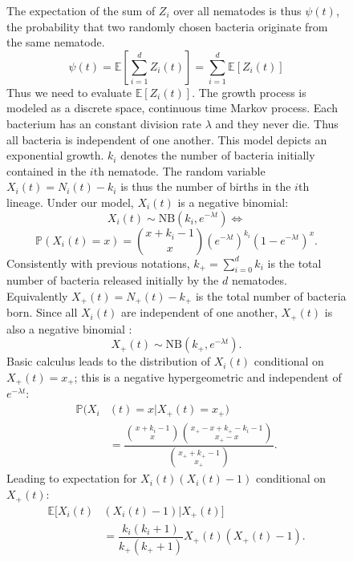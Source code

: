 \documentclass[10pt]{article}
\newcommand{\pr}{{\mathbb{P}}}
\begin{document}
\begin{multicols}{2}
\begin{figure*}[hbtp!]
\begin{mdframed}
\begin{multicols}{2}
The expectation of the sum of $Z_i$ over all nematodes is thus $\psi (t)$, the probability
that two randomly chosen bacteria originate from the same nematode.
\begin{equation}
\psi(t) = \mathbb{E} \left[ \sum_{i=1}^d Z_i(t) \right] = \sum_{i=1}^d \mathbb{E}[ Z_i(t)]
\end{equation}
Thus we need to evaluate $\mathbb{E}[ Z_i(t)]$.
The growth process is modeled as a discrete space, continuous time Markov process. Each bacterium has an constant division rate $\lambda$ and they never die. Thus all bacteria is independent of one another. This model depicts an exponential growth.
$k_i$ denotes the number of bacteria initially contained in the $i$th nematode. The random variable $X_i(t)=N_i(t)-k_i$ is thus the number of births in the $i$th lineage. Under our model,
$X_i(t)$ is a negative binomial\cite[p. 158]{cox1977theory}:
\begin{equation}
X_i(t) \sim \mathrm{NB} \left( k_i, e^{-\lambda t} \right) \iff
\end{equation}
\begin{equation}
\pr(X_i(t)=x)=\binom{x+k_i -1}{x} \left( e^{-\lambda t} \right)^{k_i} \left( 1-e^{-\lambda t} \right)^{x}.
\end{equation}
Consistently with previous notations, $k_+=\sum_{i=0}^d k_i$ is the total number of bacteria released initially by the $d$ nematodes.
Equivalently $X_+(t)=N_+(t)-k_+$ is the total number of bacteria born. Since all $X_i(t)$ are independent of one another, $X_+(t)$ is also a negative binomial \cite{johnson2005univariate}:
\begin{equation}
 X_+(t)  \sim \mathrm{NB} \left( k_+, e^{-\lambda t} \right).
\end{equation}
Basic calculus leads to the distribution of $X_i(t)$ conditional on $ X_+(t)=x_+ $; this is a negative hypergeometric and independent of $e^{-\lambda t}$:
\begin{align}
\pr( X_i & (t) =x \vert X_+(t)=x_+ )  \nonumber \\
& = \dfrac{\displaystyle \binom{x+k_i-1}{x} \binom{x_+-x+k_+-k_i-1}{x_+-x}}{\displaystyle \binom{x_+ +k_+ -1}{x_+}}.
\end{align}
Leading to expectation for $X_i(t)(X_i(t)-1)$ conditional on $X_+(t)$:
\begin{align}
 \mathbb{E} [ X_i(t)& (X_i(t)-1) \vert X_+(t) ]  \nonumber \\
 &=\dfrac{k_i(k_i+1)}{k_+ (k_+ +1 )}X_+(t) ( X_+(t) -1 ).
\end{align}

\end{multicols}
\end{mdframed}
\end{figure*}
\end{multicols}
\end{document}
